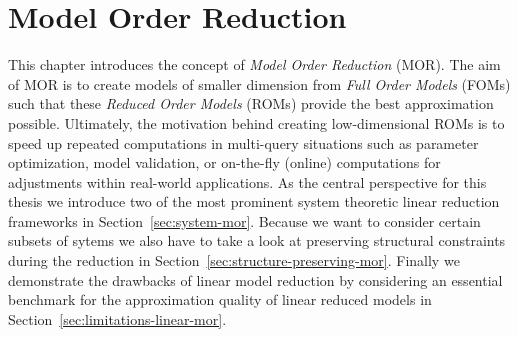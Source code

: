 \chapter{Model Order Reduction}\label{chap:linear-mor}

This chapter introduces the concept of \emph{Model Order Reduction} (MOR).
The aim of MOR is to create models of smaller dimension from \emph{Full Order Models} (FOMs) such that these \emph{Reduced Order Models} (ROMs) provide the best approximation possible.
Ultimately, the motivation behind creating low-dimensional ROMs is to speed up repeated computations in multi-query situations such as parameter optimization, model validation, or on-the-fly (online) computations for adjustments within real-world applications.
As the central perspective for this thesis we introduce two of the most prominent system theoretic linear reduction frameworks in Section~\ref{sec:system-mor}.
Because we want to consider certain subsets of sytems we also have to take a look at preserving structural constraints during the reduction in Section~\ref{sec:structure-preserving-mor}.
Finally we demonstrate the drawbacks of linear model reduction by considering an essential benchmark for the approximation quality of linear reduced models in Section~\ref{sec:limitations-linear-mor}.




